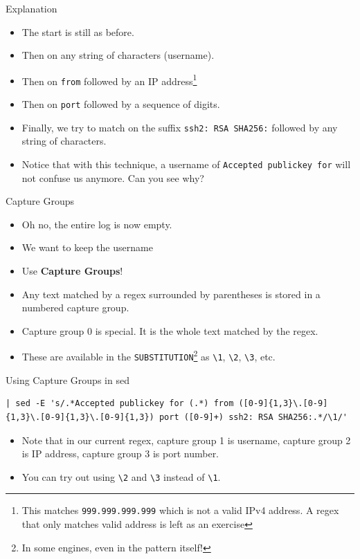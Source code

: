 \documentclass[12pt]{beamer}
\begin{document}
\begin{frame}{Explanation}
  \begin{itemize}
    \item The start is still as before.
    \item Then on any string of characters (username).
    \item Then on \texttt{from} followed by an IP address\footnote{This matches \texttt{999.999.999.999} which is not a valid IPv4 address. A regex that only matches valid address is left as an exercise}
    \item Then on \texttt{port} followed by a sequence of digits.
    \item Finally, we try to match on the suffix \texttt{ssh2: RSA SHA256:} followed by any string of characters.
    \item Notice that with this technique, a username of \texttt{Accepted publickey for} will not confuse us anymore. Can you see why?
  \end{itemize}
\end{frame}

\begin{frame}{Capture Groups}
  \begin{itemize}
    \item Oh no, the entire log is now empty.
    \item We want to keep the username
    \item Use \textbf{Capture Groups}!
    \item Any text matched by a regex surrounded by parentheses is stored in a numbered capture group.
    \item Capture group 0 is special. It is the whole text matched by the regex.
    \item These are available in the \texttt{SUBSTITUTION}\footnote{In some engines, even in the pattern itself!} as \texttt{\textbackslash 1}, \texttt{\textbackslash 2}, \texttt{\textbackslash 3}, etc.
  \end{itemize}
\end{frame}

\begin{frame}[fragile]{Using Capture Groups in sed}
  \begin{verbatim}
| sed -E 's/.*Accepted publickey for (.*) from ([0-9]{1,3}\.[0-9]{1,3}\.[0-9]{1,3}\.[0-9]{1,3}) port ([0-9]+) ssh2: RSA SHA256:.*/\1/'
  \end{verbatim}
  \begin{itemize}
    \item Note that in our current regex, capture group 1 is username, capture group 2 is IP address, capture group 3 is port number.
    \item You can try out using \texttt{\textbackslash 2} and \texttt{\textbackslash 3} instead of \texttt{\textbackslash 1}.
  \end{itemize}
\end{frame}
\end{document}
